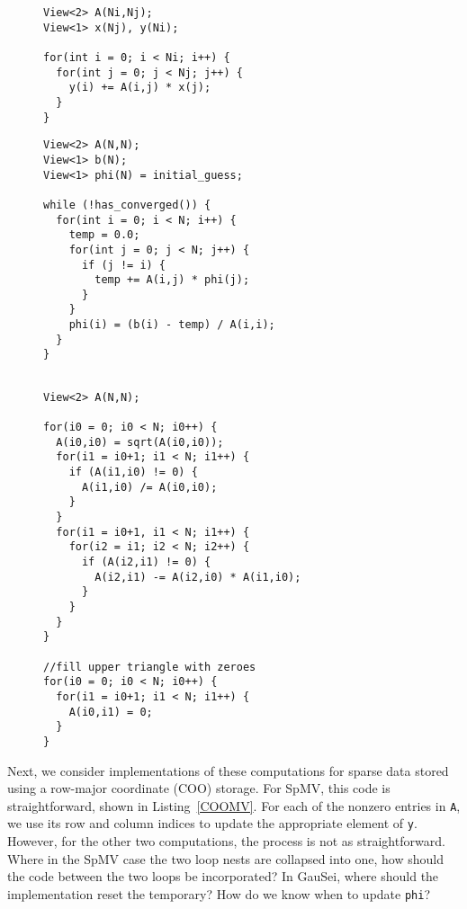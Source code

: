\begin{figure}
\begin{lstlisting}[caption={C-like implementation of dense matrix vector multiplication.},label=DenseMV]
View<2> A(Ni,Nj);
View<1> x(Nj), y(Ni);

for(int i = 0; i < Ni; i++) {
  for(int j = 0; j < Nj; j++) {
    y(i) += A(i,j) * x(j);
  }
}
\end{lstlisting}
\end{figure}
\begin{figure}
\begin{lstlisting}[caption={C-like implementation of dense Gauss-Seidel iterative solve.},label=DenseGauSei]
View<2> A(N,N);
View<1> b(N);
View<1> phi(N) = initial_guess;

while (!has_converged()) {
  for(int i = 0; i < N; i++) {
    temp = 0.0;
    for(int j = 0; j < N; j++) {
      if (j != i) {
        temp += A(i,j) * phi(j);
      }
    }
    phi(i) = (b(i) - temp) / A(i,i);
  }
}
\end{lstlisting}
\end{figure}
\begin{figure}
\begin{lstlisting}[caption={C-like implementation of dense incomplete Cholesky factorization},label=DenseInCholFact]

View<2> A(N,N);

for(i0 = 0; i0 < N; i0++) {
  A(i0,i0) = sqrt(A(i0,i0));
  for(i1 = i0+1; i1 < N; i1++) {
    if (A(i1,i0) != 0) {
      A(i1,i0) /= A(i0,i0);
    }
  }
  for(i1 = i0+1, i1 < N; i1++) {
    for(i2 = i1; i2 < N; i2++) {
      if (A(i2,i1) != 0) {
        A(i2,i1) -= A(i2,i0) * A(i1,i0);
      }
    }
  }
}

//fill upper triangle with zeroes
for(i0 = 0; i0 < N; i0++) {
  for(i1 = i0+1; i1 < N; i1++) {
    A(i0,i1) = 0;
  }
}
\end{lstlisting}
\end{figure}

Next, we consider implementations of these computations for sparse data stored using a row-major coordinate (COO) storage.
For SpMV, this code is straightforward, shown in Listing~\ref{COOMV}.
For each of the nonzero entries in \verb.A., we use its row and column indices to update the appropriate element of \verb.y..
However, for the other two computations, the process is not as straightforward.
Where in the SpMV case the two loop nests are collapsed into one, how should the code between the two loops be incorporated? 
In GauSei, where should the implementation reset the temporary? 
How do we know when to update \verb.phi.?


